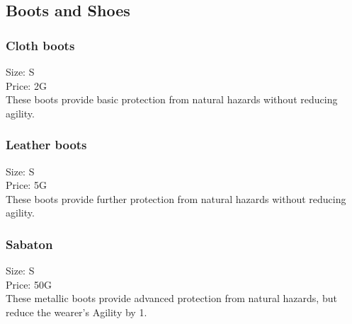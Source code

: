 \subsection{Boots and Shoes}

\subsubsection{Cloth boots}
Size: S\\
Price: 2G\\
These boots provide basic protection from natural hazards without reducing agility.

\subsubsection{Leather boots}
Size: S\\
Price: 5G\\
These boots provide further protection from natural hazards without reducing agility.

\subsubsection{Sabaton}
Size: S\\
Price: 50G\\
These metallic boots provide advanced protection from natural hazards, but reduce the wearer's Agility by 1.
